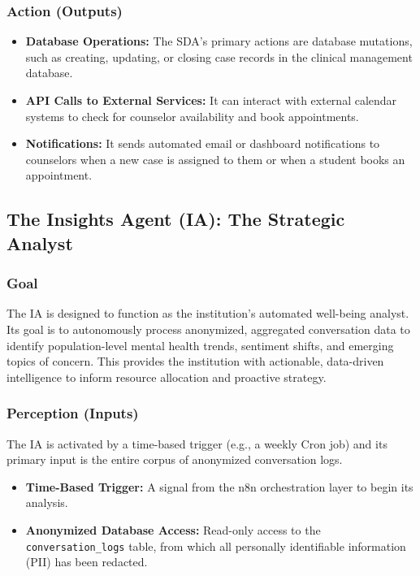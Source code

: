 \subsubsection{Action (Outputs)}
\begin{itemize}
    \item \textbf{Database Operations:} The SDA's primary actions are database mutations, such as creating, updating, or closing case records in the clinical management database.
    \item \textbf{API Calls to External Services:} It can interact with external calendar systems to check for counselor availability and book appointments.
    \item \textbf{Notifications:} It sends automated email or dashboard notifications to counselors when a new case is assigned to them or when a student books an appointment.
\end{itemize}

\subsection{The Insights Agent (IA): The Strategic Analyst}

\subsubsection{Goal}
The IA is designed to function as the institution's automated well-being analyst. Its goal is to autonomously process anonymized, aggregated conversation data to identify population-level mental health trends, sentiment shifts, and emerging topics of concern. This provides the institution with actionable, data-driven intelligence to inform resource allocation and proactive strategy.

\subsubsection{Perception (Inputs)}
The IA is activated by a time-based trigger (e.g., a weekly Cron job) and its primary input is the entire corpus of anonymized conversation logs.
\begin{itemize}
    \item \textbf{Time-Based Trigger:} A signal from the n8n orchestration layer to begin its analysis.
    \item \textbf{Anonymized Database Access:} Read-only access to the \texttt{conversation\_logs} table, from which all personally identifiable information (PII) has been redacted.
\end{itemize}

